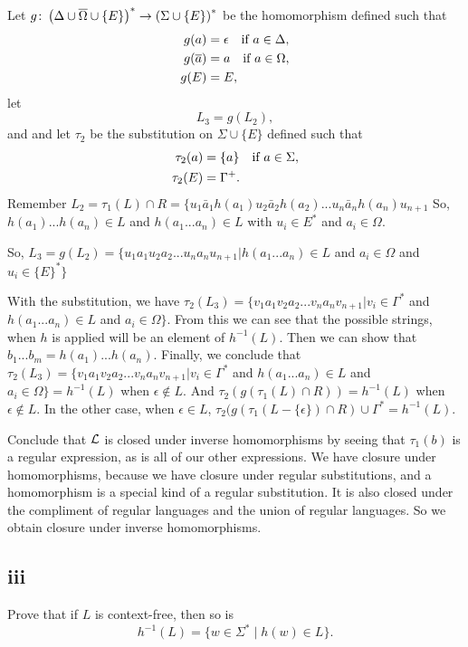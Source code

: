 \documentclass[12pt]{article}
\begin{document}
Let $g\colon \left(\Delta\cup\overline{\Omega}\cup\{E\}\right)^*\rightarrow \left(\Sigma\cup \{E\}\right)^*$
be the homomorphism defined such that
\begin{align*}
g(a) &= \epsilon\quad \hbox{if $a\in\Delta$},\\
g(\overline{a}) &= a\quad \hbox{if $a\in\Omega$},\\
g(E) &= E,
\end{align*}
let 
\[L_3 = g(L_2),\]
and
and let $\tau_2$ be the substitution on $\Sigma\cup\{E\}$
defined such that
\begin{align*}
\tau_2(a) &= \{a\}\quad \hbox{if $a\in\Sigma$},\\
\tau_2(E) &= \Gamma^+.
\end{align*}
Remember $L_2 = \tau_1(L) \cap R = \{u_1\bar a_1h(a_1)u_2\bar a_2 h(a_2)...u_n \bar a_n h(a_n) u_{n+1}$ So, $h(a_1)...h(a_n) \in L$ and $h(a_1...a_n) \in L$ with $u_i \in E^*$ and $a_i \in \Omega$. 

So, $L_3 = g(L_2)=\{u_1a_1u_2a_2...u_na_nu_{n+1} | h(a_1...a_n) \in L$ and $a_i \in \Omega$ and $u_i \in \{E\}^* \}$ \newline

With the substitution, we have $\tau_2(L_3)= \{v_1a_1v_2a_2...v_na_nv_{n+1} | v_i \in \Gamma^*$ and $h(a_1...a_n) \in L$ and $a_i \in \Omega \}$. From this we can see that the possible strings, when $h$ is applied will be an element of $h^{-1}(L)$. Then we can show that $b_1...b_m=h(a_1)...h(a_n)$. Finally, we conclude that $\tau_2(L_3)= \{v_1a_1v_2a_2...v_na_nv_{n+1} | v_i \in \Gamma^*$ and $h(a_1...a_n) \in L$ and $a_i \in \Omega \} = h^{-1}(L)$ when $\epsilon \not \in L$. And $\tau_2(g(\tau_1(L) \cap R)) = h^{-1}(L)$ when $\epsilon \not \in L$. In the other case, when $\epsilon \in L$, $\tau_2(g(\tau_1(L-\{\epsilon\}) \cap R) \cup \Gamma^* = h^{-1}(L)$. 

\medskip

Conclude that ${\cal L}$ is closed under inverse homomorphisms by seeing that $\tau_1(b)$ is a regular expression, as is all of our other expressions. We have closure under homomorphisms, because we have closure under regular substitutions, and a homomorphism is a special kind of a regular substitution. It is also closed under the compliment of regular languages and the union of regular languages. So we obtain closure under inverse homomorphisms. 

\subsection*{iii}

Prove that if $L$ is context-free,
then so is 
$$h^{-1}(L) = \{w\in \Sigma^* \mid  h(w) \in L\}.$$
\end{document}
